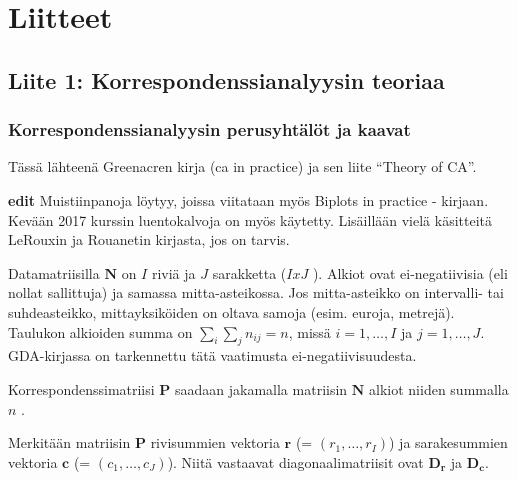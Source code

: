 \documentclass[
  finnish,
]{book}
\begin{document}
\hypertarget{liitteet}{%
\chapter*{Liitteet}\label{liitteet}}

\hypertarget{liite-1-korrespondenssianalyysin-teoriaa}{%
\section*{Liite 1: Korrespondenssianalyysin teoriaa}\label{liite-1-korrespondenssianalyysin-teoriaa}}

\hypertarget{korrespondenssianalyysin-perusyhtuxe4luxf6t-ja-kaavat}{%
\subsection*{Korrespondenssianalyysin perusyhtälöt ja kaavat}\label{korrespondenssianalyysin-perusyhtuxe4luxf6t-ja-kaavat}}

Tässä lähteenä Greenacren kirja\citep{RefWorks:doc:5a857a43e4b0ed2d44664d78} (ca in practice) ja sen liite
``Theory of CA''.

\textbf{edit} Muistiinpanoja löytyy, joissa viitataan myös Biplots in practice - kirjaan.
Kevään 2017 kurssin luentokalvoja on myös käytetty. Lisäillään vielä käsitteitä
LeRouxin ja Rouanetin kirjasta, jos on tarvis.

Datamatriisilla \(\boldsymbol{N}\) on \(I\) riviä ja \(J\) sarakketta (\(I x J\) ).
Alkiot ovat ei-negatiivisia (eli nollat sallittuja) ja samassa mitta-asteikossa.
Jos mitta-asteikko on intervalli- tai suhdeasteikko, mittayksiköiden on oltava
samoja (esim. euroja, metrejä). Taulukon alkioiden summa on
\(\sum_{i} \sum_{j}n_{ij} = n\), missä \(i = 1, \dots , I\) ja \(j = 1, \dots , J\).
GDA-kirjassa on tarkennettu tätä vaatimusta ei-negatiivisuudesta.

Korrespondenssimatriisi \(\boldsymbol{P}\) saadaan jakamalla matriisin
\(\boldsymbol{N}\) alkiot niiden summalla \(n\) .

Merkitään matriisin \(\boldsymbol{P}\) rivisummien vektoria
\(\boldsymbol{r}\) (= \((r_{1}, \dots, r_{I})\)) ja sarakesummien vektoria
\(\boldsymbol{c}\) (= \((c_{1}, \dots, c_{J})\)).
Niitä vastaavat diagonaalimatriisit ovat \(\boldsymbol{D_r}\) ja
\(\boldsymbol{D_c}\).
\end{document}
